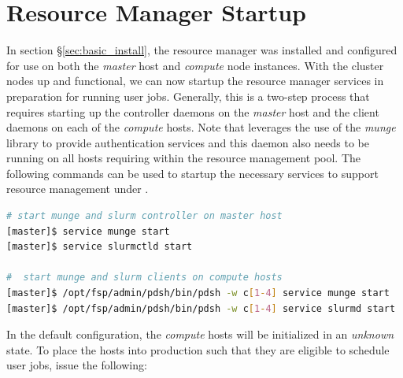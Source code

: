 \documentclass[letterpaper]{article}
\begin{document}

\vspace*{0.2cm}

\section{Resource Manager Startup}

In section \S\ref{sec:basic_install}, the \SLURM{} resource manager was installed
and configured for use on both the {\em master} host and {\em compute} node
instances. With the cluster nodes up and functional, we can now startup the
resource manager services in preparation for running user jobs. Generally, this
is a two-step process that requires starting up the controller daemons on the {\em
  master} host and the client daemons on each of the {\em compute} hosts.  
Note that \SLURM{} leverages the use of the {\em munge} library to provide
authentication services and this daemon also needs to be running on all hosts
requiring within the resource management pool. 
The following commands can be used to startup the necessary services to support
resource management under \SLURM{}.

\vspace*{0.3cm}

\begin{lstlisting}[language=bash]
# start munge and slurm controller on master host
[master]$ service munge start
[master]$ service slurmctld start

#  start munge and slurm clients on compute hosts
[master]$ /opt/fsp/admin/pdsh/bin/pdsh -w c[1-4] service munge start
[master]$ /opt/fsp/admin/pdsh/bin/pdsh -w c[1-4] service slurmd start
\end{lstlisting}

In the default configuration, the {\em compute} hosts will be initialized in an
{\em unknown} state. To place the hosts into production such that they are
eligible to schedule user jobs, issue the following:
\end{document}

